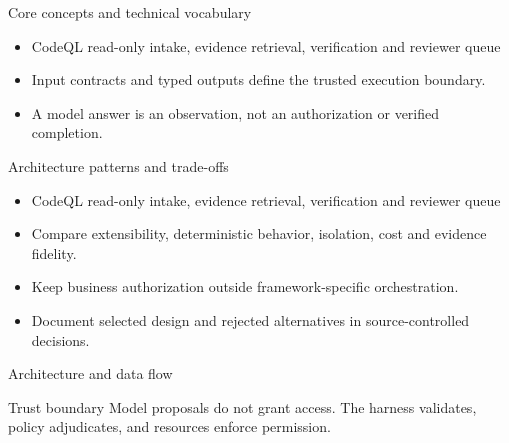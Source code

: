 \documentclass[aspectratio=169,10pt]{beamer}
\begin{document}
\begin{frame}{Core concepts and technical vocabulary}
\small
\begin{itemize}
\item CodeQL read-only intake, evidence retrieval, verification and reviewer queue
\item Input contracts and typed outputs define the trusted execution boundary.
\item A model answer is an observation, not an authorization or verified completion.
\end{itemize}

\end{frame}

\begin{frame}{Architecture patterns and trade-offs}
\small
\begin{itemize}
\item CodeQL read-only intake, evidence retrieval, verification and reviewer queue
\item Compare extensibility, deterministic behavior, isolation, cost and evidence fidelity.
\item Keep business authorization outside framework-specific orchestration.
\item Document selected design and rejected alternatives in source-controlled decisions.
\end{itemize}

\end{frame}

\begin{frame}{Architecture and data flow}
\small
\centering
{}
\vspace{0.6cm}
\begin{block}{Trust boundary}
Model proposals do not grant access. The harness validates, policy adjudicates, and resources enforce permission.
\end{block}
\end{frame}
\end{document}
